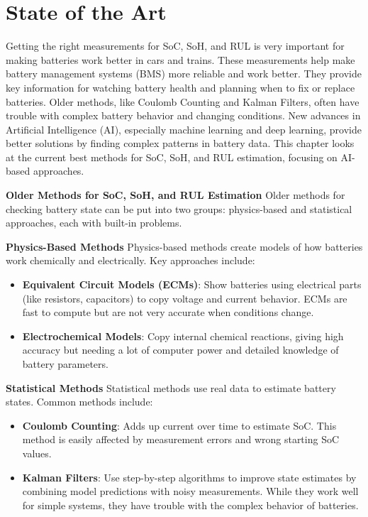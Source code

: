 \chapter{State of the Art}
\label{ch:stateoftheart}
Getting the right measurements for SoC, SoH, and RUL is very important for making batteries work better in cars and trains. These measurements help make battery management systems (BMS) more reliable and work better. They provide key information for watching battery health and planning when to fix or replace batteries. Older methods, like Coulomb Counting and Kalman Filters, often have trouble with complex battery behavior and changing conditions. New advances in Artificial Intelligence (AI), especially machine learning and deep learning, provide better solutions by finding complex patterns in battery data. This chapter looks at the current best methods for SoC, SoH, and RUL estimation, focusing on AI-based approaches.

\textbf{Older Methods for SoC, SoH, and RUL Estimation}
\label{subsec:traditional_methods}
Older methods for checking battery state can be put into two groups: physics-based and statistical approaches, each with built-in problems.

\textbf{Physics-Based Methods}
Physics-based methods create models of how batteries work chemically and electrically. Key approaches include:
\begin{itemize}
    \item \textbf{Equivalent Circuit Models (ECMs)}: Show batteries using electrical parts (like resistors, capacitors) to copy voltage and current behavior. ECMs are fast to compute but are not very accurate when conditions change.
    \item \textbf{Electrochemical Models}: Copy internal chemical reactions, giving high accuracy but needing a lot of computer power and detailed knowledge of battery parameters.
\end{itemize}

\textbf{Statistical Methods}
Statistical methods use real data to estimate battery states. Common methods include:
\begin{itemize}
    \item \textbf{Coulomb Counting}: Adds up current over time to estimate SoC. This method is easily affected by measurement errors and wrong starting SoC values.
    \item \textbf{Kalman Filters}: Use step-by-step algorithms to improve state estimates by combining model predictions with noisy measurements. While they work well for simple systems, they have trouble with the complex behavior of batteries.
\end{itemize}

